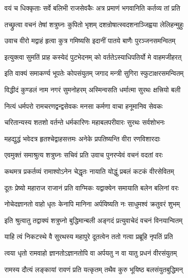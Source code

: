 \twolineshloka
{वयं च धिक्कृताः सर्वे बलिभी राजसेवकैः}
{अत्र प्रमाणं भगवानिति कर्तव्य तां प्रति}%

\twolineshloka
{तच्छ्रुत्वा वचनं तेषां शत्रुघ्नः कुपितो भृशम्}
{दशन्रोषात्स्वदशनाञ्जिह्वया लेलिहन्मुहुः}%

\twolineshloka
{उवाच वीरो मद्वाहं हृत्वा कुत्र गमिष्यसि}
{इदानीं पातये बाणैः पुरञ्जनसमन्वितम्}%

\twolineshloka
{इत्युक्त्वा सुमतिं प्राह कस्येदं पुटभेदनम्}
{को वर्ततेऽस्याधिपतिर्यो मे वाहमजीहरत्}%


\twolineshloka
{इति वाक्यं समाकर्ण्य भूपतेः कोपसंयुतम्}
{जगाद मन्त्री सुगिरा स्फुटाक्षरसमन्वितम्}%

\twolineshloka
{विद्धीदं कुण्डलं नाम नगरं सुमनोहरम्}
{अस्मिन्वसति धर्मात्मा सुरथः क्षत्त्रियो बली}%

\twolineshloka
{नित्यं धर्मपरो रामचरणद्वन्द्वसेवकः}
{मनसा कर्मणा वाचा हनूमानिव सेवकः}%

\twolineshloka
{चरितान्यस्य शतशो वर्तन्ते धर्मकारिणः}
{महाबलपरीवारः सुरथः सर्वशोभनः}%

\twolineshloka
{महद्युद्धं भवेदत्र हृतश्चेद्वाहसत्तमः}
{अनेके प्रपतिष्यन्ति वीरा रणविशारदाः}%

\twolineshloka
{एवमुक्तं समाश्रुत्य शत्रुघ्नः सचिवं प्रति}
{उवाच पुनरप्येवं वचनं वदतां वरः}%


\twolineshloka
{कथमत्र प्रकर्तव्यं रामाश्वोऽनेन चेद्धृतः}
{नायाति योद्धुं प्रबलं कटकं वीरसेवितम्}%


\twolineshloka
{दूतः प्रेष्यो महाराज राजानं प्रति वाग्मिकः}
{यद्वाक्येन समायाति बलेन बलिनां वरः}%

\twolineshloka
{नोचेदज्ञानतो वाहो धृतः केनापि मानिना}
{अर्पयिष्यति नः साधुमश्वं क्रतुवरं शुभम्}%

\twolineshloka
{इति श्रुत्वातु तद्वाक्यं शत्रुघ्नो बुद्धिमान्बली}
{अङ्गदं प्रत्युवाचेदं वचनं विनयान्वितम्}%


\twolineshloka
{याहि त्वं निकटस्थे वै सुरथस्य महापुरे}
{दूतत्वेन ततो गत्वा प्रब्रूहि नृपतिं प्रति}%

\twolineshloka
{त्वया धृतो रामवाहो ज्ञानतोऽज्ञानतोपि वा}
{अर्पयतु न वा यातु प्रधनं वीरसंयुतम्}%

\twolineshloka
{रामस्य दौत्यं लङ्कायां रावणं प्रति यत्कृतम्}
{तथैव कुरु भूयिष्ठ बलसंयुतबुद्धिमन्}%

